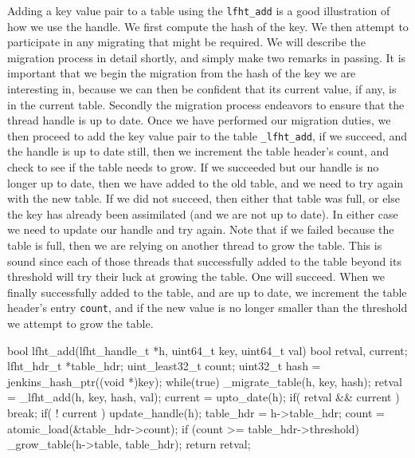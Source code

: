 Adding a key value pair to a table using the \texttt{lfht\_add} is a good illustration of
how we use the handle. We first compute the hash of the key. We then attempt to participate in any
migrating that might be required. We will describe the migration process in detail shortly, and
simply make two remarks in passing. It is important that we begin the migration from the hash of the
key we are interesting in, because we can then be confident that its current value, if any, is in
the current table. Secondly the migration process endeavors to ensure that the thread handle is up to date.
Once we have performed our migration duties, we then proceed to add the key value pair to the
table \texttt{\_lfht\_add}, if we succeed, and the handle is up to date still, then we increment
the table header's count, and check to see if the table needs to grow.
If we succeeded but our handle is no longer up to date, then we have added to the old table,
and we need to try again with the new table. If we did not succeed, then either that table
was full, or else the key has already been assimilated (and we are not  up to date). In either case
we need to update our handle and try again. Note that if we failed because the table is full, then
we are relying on another thread to grow the table. This is sound since each of those threads that
successfully added to the table beyond its threshold will try their luck at growing the table. One will
succeed. When we finally successfully added to the table, and are up to date, we increment the
table header's entry \texttt{count}, and if the new value is no longer smaller than the threshold
we attempt to grow the table.




\begin{center}
\begin{clisting}
bool lfht_add(lfht_handle_t *h, uint64_t key, uint64_t val){
  bool retval, current;
  lfht_hdr_t *table_hdr;
  uint_least32_t count;
  uint32_t hash = jenkins_hash_ptr((void *)key);
  while(true){
    _migrate_table(h, key, hash);
    retval = _lfht_add(h, key, hash, val);
    current = upto_date(h);
    if( retval && current ){ break; }
    if( ! current ){ update_handle(h); }
  }
  table_hdr = h->table_hdr;
  count = atomic_load(&table_hdr->count);
  if (count >= table_hdr->threshold){
    _grow_table(h->table, table_hdr);
  }
  return retval;
}

\end{clisting}
\end{center}


